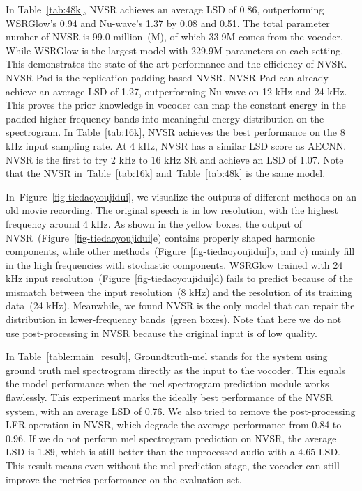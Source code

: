 \documentclass[a4paper]{article}
\def\Figref#1{Figure~\ref{#1}}
\def\Tabref#1{Table~\ref{#1}}
\begin{document}
In \Tabref{tab:48k}, NVSR achieves an average LSD of \num{0.86}, outperforming WSRGlow's \num{0.94} and Nu-wave's \num{1.37} by \num{0.08} and \num{0.51}. The total parameter number of NVSR is \num{99.0} million~(M), of which \num{33.9}M comes from the vocoder. While WSRGlow is the largest model with \num{229.9}M parameters on each setting. This demonstrates the state-of-the-art performance and the efficiency of NVSR. NVSR-Pad is the replication padding-based NVSR. NVSR-Pad can already achieve an average LSD of \num{1.27}, outperforming Nu-wave on \num{12} kHz and \num{24} kHz. This proves the prior knowledge in vocoder can map the constant energy in the padded higher-frequency bands into meaningful energy distribution on the spectrogram. 
In \Tabref{tab:16k}, NVSR achieves the best performance on the \num{8} kHz input sampling rate. At \num{4} kHz, NVSR has a similar LSD score as AECNN. NVSR is the first to try \num{2} kHz to \num{16} kHz SR and achieve an LSD of \num{1.07}. Note that the NVSR in~\Tabref{tab:16k} and~\Tabref{tab:48k} is the same model.

In~\Figref{fig-tiedaoyoujidui}, we visualize the outputs of different methods on an old movie recording. The original speech is in low resolution, with the highest frequency around \num{4} kHz. As shown in the yellow boxes, the output of NVSR~(\Figref{fig-tiedaoyoujidui}e) contains properly shaped harmonic components, while other methods~(\Figref{fig-tiedaoyoujidui}b, and c) mainly fill in the high frequencies with stochastic components. WSRGlow trained with \num{24} kHz input resolution~(\Figref{fig-tiedaoyoujidui}d) fails to predict because of the mismatch between the input resolution~(\num{8} kHz) and the resolution of its training data~(\num{24} kHz). Meanwhile, we found NVSR is the only model that can repair the distribution in lower-frequency bands~(green boxes). Note that here we do not use post-processing in NVSR because the original input is of low quality. 



In \Tabref{table:main_result}, Groundtruth-mel stands for the system using ground truth mel spectrogram directly as the input to the vocoder. This equals the model performance when the mel spectrogram prediction module works flawlessly. This experiment marks the ideally best performance of the NVSR system, with an average LSD of \num{0.76}. We also tried to remove the post-processing LFR operation in NVSR, which degrade the average performance from \num{0.84} to \num{0.96}. If we do not perform mel spectrogram prediction on NVSR, the average LSD is \num{1.89}, which is still better than the unprocessed audio with a \num{4.65} LSD. This result means even without the mel prediction stage, the vocoder can still improve the metrics performance on the evaluation set.
\end{document}
